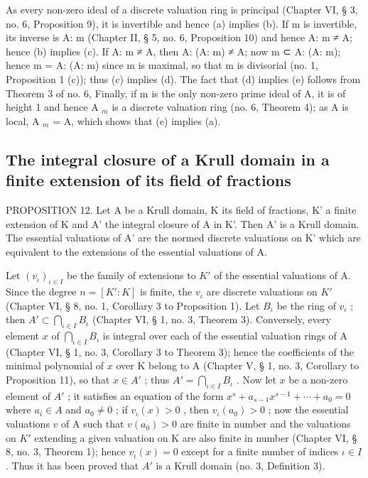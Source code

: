 As every non-zero ideal of a discrete valuation ring is principal (Chapter VI, § 3, no. 6, Proposition 9), it is invertible and hence (a) implies (b). If m is invertible, its inverse is A: m (Chapter II, § 5, no. 6, Proposition 10) and hence A: m ≠ A; hence (b) implies (c). If A: m ≠ A, then A: (A: m) ≠ A; now m ⊂ A: (A: m); hence m = A: (A: m) since m is maximal, so that m is divisorial (no. 1, Proposition 1 (c)); thus (c) implies (d). The fact that (d) implies (e) follows from Theorem 3 of no. 6, Finally, if m is the only non-zero prime ideal of A, it is of height 1 and hence A \(_{m}\) is a discrete valuation ring (no. 6, Theorem 4); as A is local, A \(_{m}\) = A, which shows that (e) implies (a).

\subsection{The integral closure of a Krull domain in a finite extension of its field of fractions}

PROPOSITION 12. Let A be a Krull domain, K its field of fractions, K' a finite extension of K and A' the integral closure of A in K'. Then A' is a Krull domain. The essential valuations of A' are the normed discrete valuations on K' which are equivalent to the extensions of the essential valuations of A.

Let \((v_{\iota})_{\iota\in I}\) be the family of extensions to \(K'\) of the essential valuations of A. Since the degree \(n = [K':K]\) is finite, the \(v_{\iota}\) are discrete valuations on \(K'\) (Chapter VI, § 8, no. 1, Corollary 3 to Proposition 1). Let \(B_{\iota}\) be the ring of \(v_{\iota}\) ; then \(A' \subset \bigcap_{\iota\in I}B_{\iota}\) (Chapter VI, § 1, no. 3, Theorem 3). Conversely, every element \(x\) of \(\bigcap_{\iota\in I}B_{\iota}\) is integral over each of the essential valuation rings of A (Chapter VI, § 1, no. 3, Corollary 3 to Theorem 3); hence the coefficients of the minimal polynomial of \(x\) over K belong to A (Chapter V, § 1, no. 3, Corollary to Proposition 11), so that \(x\in A'\) ; thus \(A' = \bigcap_{\iota\in I}B_{\iota}\) . Now let \(x\) be a non-zero element of \(A'\) ; it satisfies an equation of the form \(x^{s} + a_{s-1}x^{s-1} + \cdots + a_{0} = 0\) where \(a_{i}\in A\) and \(a_{0}\neq 0\) ; if \(v_{\iota}(x) > 0\) , then \(v_{\iota}(a_{0}) > 0\) ; now the essential valuations \(v\) of A such that \(v(a_{0}) > 0\) are finite in number and the valuations on \(K'\) extending a given valuation on K are also finite in number (Chapter VI, § 8, no. 3, Theorem 1); hence \(v_{\iota}(x) = 0\) except for a finite number of indices \(\iota\in I\) . Thus it has been proved that \(A'\) is a Krull domain (no. 3, Definition 3).

